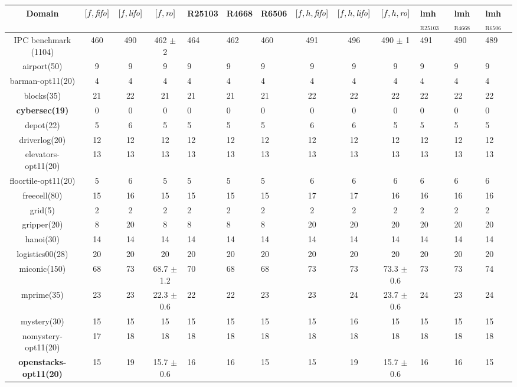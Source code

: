 \begin{center}
\begin{tabular}{|c|cccHHH|cccHHH|}
\hline
Domain & \([f,{\text{\textit{fifo}}}]\) & \([f,{\text{\textit{lifo}}}]\) & \([f,{\text{\textit{ro}}}]\) & R25103 & R4668 & R6506 & \([f,h,{\text{\textit{fifo}}}]\) & \([f,h,{\text{\textit{lifo}}}]\) & \([f,h,{\text{\textit{ro}}}]\) & lmh\(_{\text{R25103}}\) & lmh\(_{\text{R4668}}\) & lmh\(_{\text{R6506}}\)\\
\hline
IPC benchmark (1104) & 460 & 490 & 462 \(\pm\) 2 & 464 & 462 & 460 & 491 & 496 & 490 \(\pm\) 1 & 491 & 490 & 489\\
\hline
airport(50) & 9 & 9 & 9 & 9 & 9 & 9 & 9 & 9 & 9 & 9 & 9 & 9\\
barman-opt11(20) & 4 & 4 & 4 & 4 & 4 & 4 & 4 & 4 & 4 & 4 & 4 & 4\\
blocks(35) & 21 & 22 & 21 & 21 & 21 & 21 & 22 & 22 & 22 & 22 & 22 & 22\\
\textbf{cybersec(19)} & 0 & 0 & 0 & 0 & 0 & 0 & 0 & 0 & 0 & 0 & 0 & 0\\
depot(22) & 5 & 6 & 5 & 5 & 5 & 5 & 6 & 6 & 5 & 5 & 5 & 5\\
driverlog(20) & 12 & 12 & 12 & 12 & 12 & 12 & 12 & 12 & 12 & 12 & 12 & 12\\
elevators-opt11(20) & 13 & 13 & 13 & 13 & 13 & 13 & 13 & 13 & 13 & 13 & 13 & 13\\
floortile-opt11(20) & 5 & 6 & 5 & 5 & 5 & 5 & 6 & 6 & 6 & 6 & 6 & 6\\
freecell(80) & 15 & 16 & 15 & 15 & 15 & 15 & 17 & 17 & 16 & 16 & 16 & 16\\
grid(5) & 2 & 2 & 2 & 2 & 2 & 2 & 2 & 2 & 2 & 2 & 2 & 2\\
gripper(20) & 8 & 20 & 8 & 8 & 8 & 8 & 20 & 20 & 20 & 20 & 20 & 20\\
hanoi(30) & 14 & 14 & 14 & 14 & 14 & 14 & 14 & 14 & 14 & 14 & 14 & 14\\
logistics00(28) & 20 & 20 & 20 & 20 & 20 & 20 & 20 & 20 & 20 & 20 & 20 & 20\\
miconic(150) & 68 & 73 & 68.7 \(\pm\) 1.2 & 70 & 68 & 68 & 73 & 73 & 73.3 \(\pm\) 0.6 & 73 & 73 & 74\\
mprime(35) & 23 & 23 & 22.3 \(\pm\) 0.6 & 22 & 22 & 23 & 23 & 24 & 23.7 \(\pm\) 0.6 & 24 & 23 & 24\\
mystery(30) & 15 & 15 & 15 & 15 & 15 & 15 & 15 & 16 & 15 & 15 & 15 & 15\\
nomystery-opt11(20) & 17 & 18 & 18 & 18 & 18 & 18 & 18 & 18 & 18 & 18 & 18 & 18\\
\textbf{openstacks-opt11(20)} & 15 & 19 & 15.7 \(\pm\) 0.6 & 16 & 16 & 15 & 15 & 19 & 15.7 \(\pm\) 0.6 & 16 & 16 & 15\\

\end{tabular}
\end{center}
